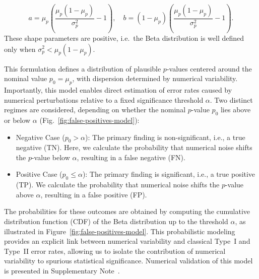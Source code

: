 \begin{equation*}
    a = \mu_p\left(\frac{\mu_p(1 - \mu_p)}{\sigma_p^2} - 1\right), \quad
    b = (1 - \mu_p)\left(\frac{\mu_p(1 - \mu_p)}{\sigma_p^2} - 1\right).
    \label{eq:beta-params}
\end{equation*}
These shape parameters are positive, i.e.\ the Beta distribution is well
defined only when $\sigma_p^2 < \mu_p(1 - \mu_p)$.

This formulation defines a distribution of plausible $p$-values centered around
the nominal value $p_0=\mu_p$, with dispersion determined by numerical
variability. Importantly, this model enables direct estimation of error rates
caused by numerical perturbations relative to a fixed significance threshold
$\alpha$. Two distinct regimes are considered, depending on whether the nominal
$p$-value $p_0$ lies above or below $\alpha$
(Fig.~\ref{fig:false-positives-model}):

\begin{itemize}
    \item Negative Case ($p_0 > \alpha$): The primary finding is non-significant, i.e., a
          true negative (TN). Here, we calculate the probability that numerical noise
          shifts the $p$-value below $\alpha$, resulting in a false negative (FN).
    \item Positive Case ($p_0 \leq \alpha$): The primary finding is significant, i.e., a
          true positive (TP). We calculate the probability that numerical noise shifts
          the $p$-value above $\alpha$, resulting in a false positive (FP).
\end{itemize}

The probabilities for these outcomes are obtained by computing the cumulative
distribution function (CDF) of the Beta distribution up to the threshold
$\alpha$, as illustrated in Figure~\ref{fig:false-positives-model}. This
probabilistic modeling provides an explicit link between numerical variability
and classical Type~I and Type~II error rates, allowing us to isolate the
contribution of numerical variability to spurious statistical significance.
Numerical validation of this model is presented in Supplementary
Note~.

\vspace{1em}


